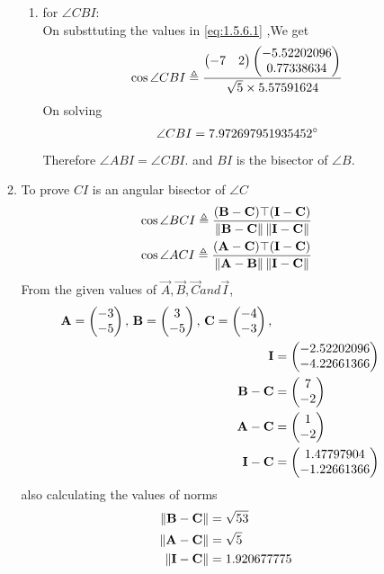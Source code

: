 \documentclass[11pt]{book}
\begin{document}
\begin{enumerate}[label=\thesection.\arabic*.,ref=\thesection.\theenumi]
\begin{enumerate}
\begin{enumerate}
       \item for $\angle CBI$: \\
    On substtuting the values in  \eqref{eq:1.5.6.1} ,We get 
    \begin{align}
        \cos{\angle CBI} \triangleq \frac{\begin{pmatrix} -7 & 2\end{pmatrix}\begin{pmatrix}-5.52202096 \\ 0.77338634\end{pmatrix}}{ \sqrt{5} \times 5.57591624} \\
    \end{align}
    On solving 
    \begin{align}
        \angle CBI = 7.972697951935452 \degree
    \end{align}
    Therefore $\angle ABI = \angle CBI.$ and $BI$ is the bisector of $\angle B$. 
\end{enumerate}


    \item To prove $CI$ is an angular bisector of $ \angle C$
\begin{align}
\label{eq:1.5.6.18}
\cos{\angle BCI} \triangleq \frac{(\vec{B}-\vec{C})\top(\vec{I}-\vec{C})}{\norm{\vec{B}-\vec{C}}\norm{\vec{I}-\vec{C}}} \\
\cos{\angle ACI} \triangleq \frac{(\vec{A}-\vec{C})\top(\vec{I}-\vec{C})}{\norm{\vec{A}-\vec{B}}\norm{\vec{I}-\vec{C}}} 
\end{align}
From the given values of $\vec{A},\vec{B},\vec{C} and \vec{I}$,\\
\begin{align}
    \mathbf{A}=\begin{pmatrix}-3 \\ -5\end{pmatrix},\,
\mathbf{B}=\begin{pmatrix}3\\-5\end{pmatrix},\,
	\mathbf{C}=\begin{pmatrix}-4\\-3\end{pmatrix},\, \\
 \mathbf{I} &= \begin{pmatrix}-2.52202096 \\ -4.22661366\end{pmatrix} \\
	\mathbf{B}-\mathbf{C} &=\begin{pmatrix}7\\-2\end{pmatrix} \\
	\mathbf{A}-\mathbf{C}&= \begin{pmatrix}1\\-2\end{pmatrix} \\
 \mathbf{I}-\mathbf{C}  &=\begin{pmatrix}1.47797904 \\ -1.22661366\end{pmatrix}
\end{align}
also calculating the values of norms
\begin{align}
	\left\lVert\mathbf{B}-\mathbf{C}\right\rVert &= \sqrt{53} \\
	\left\lVert\mathbf{A}-\mathbf{C}\right\rVert &= \sqrt{5} \\
 	\left\lVert\mathbf{I}-\mathbf{C}\right\rVert &= 1.920677775 \\
\end{align}



\end{enumerate}
\end{enumerate}
\end{document}
